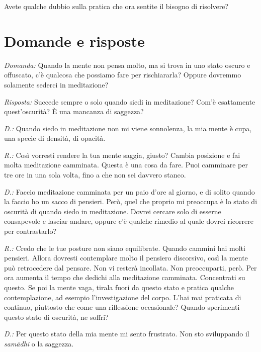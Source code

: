Avete qualche dubbio sulla pratica che ora sentite il bisogno di
risolvere?

\section{Domande e risposte}

\emph{Domanda:} Quando la mente non pensa molto, ma si trova in uno stato
oscuro e offuscato, c'è qualcosa che possiamo fare per rischiararla?
Oppure dovremmo solamente sederci in meditazione?

\emph{Risposta:} Succede sempre o solo quando siedi in meditazione? Com'è
esattamente quest'oscurità? È una mancanza di saggezza?

\emph{D.:} Quando siedo in meditazione non mi viene sonnolenza, la mia mente è
cupa, una specie di densità, di opacità.

\emph{R.:} Così vorresti rendere la tua mente saggia, giusto? Cambia posizione
e fai molta meditazione camminata. Questa è una cosa da fare. Puoi
camminare per tre ore in una sola volta, fino a che non sei davvero
stanco.

\emph{D.:} Faccio meditazione camminata per un paio d'ore al giorno, e di
solito quando la faccio ho un sacco di pensieri. Però, quel che proprio
mi preoccupa è lo stato di oscurità di quando siedo in meditazione.
Dovrei cercare solo di esserne consapevole e lasciar andare, oppure c'è
qualche rimedio al quale dovrei ricorrere per contrastarlo?

\emph{R.:} Credo che le tue posture non siano equilibrate. Quando cammini hai
molti pensieri. Allora dovresti contemplare molto il pensiero
discorsivo, così la mente può retrocedere dal pensare. Non vi resterà
incollata. Non preoccuparti, però. Per ora aumenta il tempo che dedichi
alla meditazione camminata. Concentrati su questo. Se poi la mente vaga,
tirala fuori da questo stato e pratica qualche contemplazione, ad
esempio l'investigazione del corpo. L'hai mai praticata di continuo,
piuttosto che come una riflessione occasionale? Quando sperimenti questo
stato di oscurità, ne soffri?

\emph{D.:} Per questo stato della mia mente mi sento frustrato. Non sto
sviluppando il \emph{samādhi} o la saggezza.

